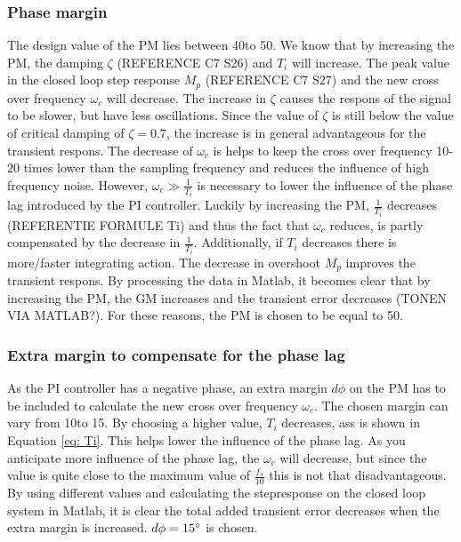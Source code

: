 \documentclass[a4paper,kul]{kulakarticle} %
\begin{document}
\subsubsection{Phase margin}
The design value of the PM lies between 40\degree to 50\degree. We know that by increasing the PM, the damping $\zeta$ (REFERENCE C7 S26) and $T_i$ will increase. The peak value in the closed loop step response $M_p$ (REFERENCE C7 S27) and the new cross over frequency $\omega_c$ will decrease. The increase in $\zeta$ causes the respons of the signal to be slower, but have less oscillations. Since the value of $\zeta$ is still below the value of critical damping of $\zeta = 0.7$, the increase is in general advantageous for the transient respons. The decrease of $\omega_c$ is helps to keep the cross over frequency 10-20 times lower than the sampling frequency and reduces the influence of high frequency noise. However, $\omega_c \gg \frac{1}{T_i}$ is necessary to lower the influence of the phase lag introduced by the PI controller. Luckily by increasing the PM, $\frac{1}{T_i}$ decreases (REFERENTIE FORMULE Ti) and thus the fact that $\omega_c$ reduces, is partly compensated by the decrease in $\frac{1}{T_i}$. Additionally, if $T_i$ decreases there is more/faster integrating action. The decrease in overshoot $M_p$ improves the transient respons. By processing the data in Matlab, it becomes clear that by increasing the PM, the GM increases and the transient error decreases (TONEN VIA MATLAB?). For these reasons, the PM is chosen to be equal to 50\degree. 

\subsubsection{Extra margin to compensate for the phase lag}
	As the PI controller has a negative phase, an extra margin $d\phi$ on the PM has to be included to calculate the new cross over frequency $\omega_c$. The chosen margin can vary from 10\degree to 15\degree. By choosing a higher value, $T_i$ decreases, ass is shown in Equation \ref{eq: Ti}. This helps lower the influence of the phase lag. As you anticipate more influence of the phase lag, the $\omega_c$ will decrease, but since the value is quite close to the maximum value of $\frac{f_s}{10}$ this is not that disadvantageous. By using different values and calculating the stepresponse on the closed loop system in Matlab, it is clear the total added transient error decreases when the extra margin is increased. $d\phi = 15\degree$ is chosen. 
\end{document}
